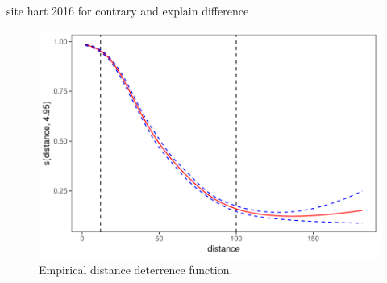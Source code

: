 \documentclass[11pt]{wlscirep}
\begin{document}
site hart 2016 for contrary and explain difference

\begin{figure}[!htbp]
\centering
\includegraphics[width=.8\linewidth]{figures/distance_function.pdf}
\caption{Empirical distance deterrence function.}
\label{fig:distance}
\end{figure}
\end{document}
